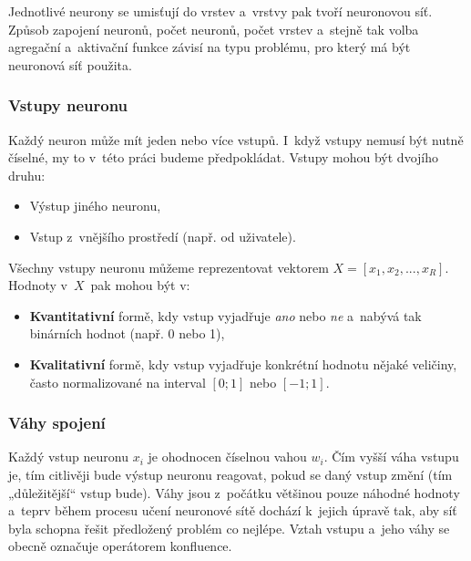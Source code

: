\documentclass[a4paper,12pt]{article}
\begin{document}
{{{{Jednotlivé neurony se umisťují do vrstev a~vrstvy pak tvoří neuronovou síť. Způsob zapojení neuronů, počet neuronů, počet vrstev a~stejně tak volba agregační a~aktivační funkce závisí na typu problému, pro který má být neuronová síť použita.


\subsubsection{Vstupy neuronu}

Každý neuron může mít jeden nebo více vstupů. I~když vstupy nemusí být nutně číselné, my to v~této práci budeme předpokládat. Vstupy mohou být dvojího druhu:

\begin{itemize}
\item Výstup jiného neuronu,
\item Vstup z~vnějšího prostředí (např. od uživatele).
\end{itemize}

Všechny vstupy neuronu můžeme reprezentovat vektorem $X = [{x_1, x_2, ..., x_R}]$. Hodnoty v~$X$~pak mohou být v:

\begin{itemize}
\item \textbf{Kvantitativní} formě, kdy vstup vyjadřuje \textit{ano} nebo \textit{ne} a~nabývá tak binárních hodnot (např. 0 nebo 1),
\item \textbf{Kvalitativní} formě, kdy vstup vyjadřuje konkrétní hodnotu nějaké veličiny, často normalizované na interval $[0; 1]$ nebo $[-1; 1]$.
\end{itemize}

\subsubsection{Váhy spojení}

Každý vstup neuronu $x_i$ je ohodnocen číselnou vahou $w_i$. Čím vyšší váha vstupu je, tím citlivěji bude výstup neuronu reagovat, pokud se daný vstup změní (tím „důležitější“ vstup bude). Váhy jsou z~počátku většinou pouze náhodné hodnoty a~teprv během procesu učení neuronové sítě dochází k~jejich úpravě tak, aby síť byla schopna řešit předložený problém co nejlépe. Vztah vstupu a~jeho váhy se obecně označuje operátorem konfluence.~\cite{nn}


}}}}
\end{document}
